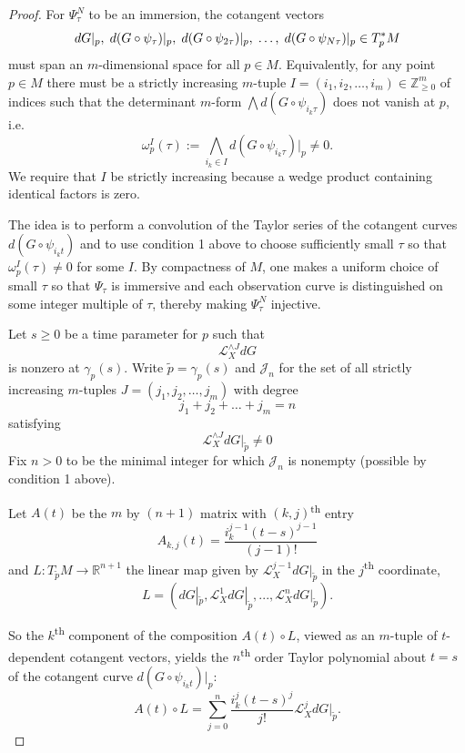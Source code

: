\documentclass[11pt]{article}
\newcommand{\ChrisEdit}[1]{\textcolor{red}{(#1)}}
\theoremstyle{definition}
\theoremstyle{remark}
\newcommand{\RR}{\mathbb{R}}
\newcommand{\ZZ}{\mathbb{Z}}
\newcommand{\Ld}{\mathcal{L}}
\newcommand{\ts}{\textsuperscript}
\begin{document}
    \begin{proof} For $\Psi_\tau^N$ to be an immersion, the cotangent vectors
    \[dG|_p, \hspace{1mm} d(G\circ\psi_\tau)|_p, \hspace{1mm}d(G\circ\psi_{2\tau})|_p, \hspace{1mm}\ldots, \hspace{1mm}d(G\circ\psi_{N\tau})|_p\in T^*_pM\]
    must span an $m$-dimensional space for all $p \in M$. Equivalently, for any point $p\in M$ there must be a strictly increasing $m$-tuple $I=(i_1, i_2, \ldots, i_m)\in \ZZ_{\geq 0}^m$ of indices such that the determinant $m$-form $\bigwedge d(G\circ\psi_{i_k\tau})$ does not vanish at $p$, i.e.
    \[\omega_{p}^I(\tau) := \bigwedge_{i_k\in I} d(G\circ\psi_{i_k\tau})|_{p} \neq 0.\]
    We require that $I$ be strictly increasing because a wedge product containing identical factors is zero.

    The idea is to perform a convolution of the Taylor series of the cotangent curves $d(G\circ\psi_{i_kt})$ and to use condition 1 above to choose sufficiently small $\tau$ so that $\omega_p^I(\tau)\neq 0$ for some $I$. By compactness of $M$, one makes a uniform choice of small $\tau$ so that $\Psi_\tau$ is immersive and each observation curve is distinguished on some integer multiple of $\tau$, thereby making $\Psi_\tau^N$ injective.

    Let $s\geq 0$ be a time parameter for $p$ such that
    \[\Ld_{X}^{\wedge J}dG\]
    is nonzero at $\gamma_p(s)$. Write $\tilde{p} = \gamma_p(s)$ and $\mathcal{J}_n$ for the set of all strictly increasing $m$-tuples $J = (j_1, j_2, \ldots, j_m)$ with degree
    \[j_1 + j_2 + \ldots + j_m = n\] satisfying \[\Ld_{X}^{\wedge J}dG|_{\tilde{p}} \neq 0\]
    Fix $n> 0$ to be the minimal integer for which $\mathcal{J}_n$ is nonempty (possible by condition 1 above).

    Let $A(t)$ be the $m$ by $(n+1)$ matrix with $(k, j)$\ts{th} entry
    \[A_{k,j}(t) = \frac{i_k^{j-1}(t-s)^{j-1}}{(j-1)!}\]
    and $L:T_{\tilde{p}}M \rightarrow \RR^{n+1}$ the linear map given by $\Ld_X^{j-1}dG|_{\tilde{p}}$ in the $j$\ts{th} coordinate,
    \[
    L = \left(dG|_{\tilde{p}}, \Ld_X^1 dG|_{\tilde{p}}, ..., \Ld_X^n dG|_{\tilde{p}}\right).
    \]
    
    So the $k$\ts{th} component of the composition $A(t)\circ L$, viewed as an $m$-tuple of $t$-dependent cotangent vectors, yields the $n$\ts{th} order Taylor polynomial about $t=s$ of the cotangent curve $d(G\circ\psi_{i_kt})|_{p}$:
    \[
    A(t) \circ L = \sum_{j=0}^n \frac{i_k^j (t-s)^j}{j!}\Ld_X^j dG|_{\tilde{p}}.
    \]


\end{proof}
\end{document}
